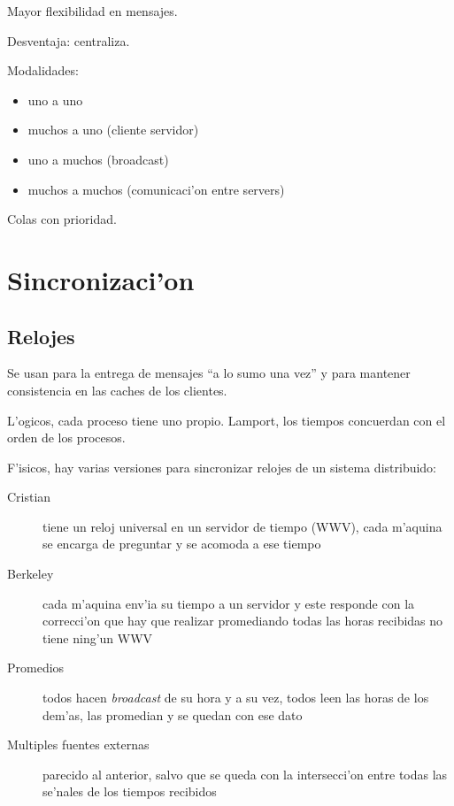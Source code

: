 \documentclass[a4paper,spanish]{article}
\begin{document}
Mayor flexibilidad en mensajes.

Desventaja: centraliza.

Modalidades:
\begin{itemize}
	\item uno a uno
	\item muchos a uno (cliente servidor)
	\item uno a muchos (broadcast)
	\item muchos a muchos (comunicaci'on entre servers)
\end{itemize}
Colas con prioridad.



\section{Sincronizaci'on}

\subsection{Relojes}
Se usan para la entrega de mensajes ``a lo sumo una vez'' y para mantener
consistencia en las caches de los clientes.

L'ogicos, cada proceso tiene uno propio. Lamport, los tiempos concuerdan con el
orden de los procesos.

F'isicos, hay varias versiones para sincronizar relojes de un sistema
distribuido:
\begin{description}
	\item[Cristian] tiene un reloj universal en un servidor de tiempo
(WWV), cada m'aquina se encarga de preguntar y se acomoda a ese tiempo
	\item[Berkeley] cada m'aquina env'ia su tiempo a un servidor y este
responde con la correcci'on que hay que realizar promediando todas las horas
recibidas no tiene ning'un WWV
	\item[Promedios] todos hacen \emph{broadcast} de su hora y a su vez,
todos leen las horas de los dem'as, las promedian y se quedan con ese dato
	\item[Multiples fuentes externas] parecido al anterior, salvo que se
queda con la intersecci'on entre todas las se'nales de los tiempos recibidos
\end{description}
\end{document}
